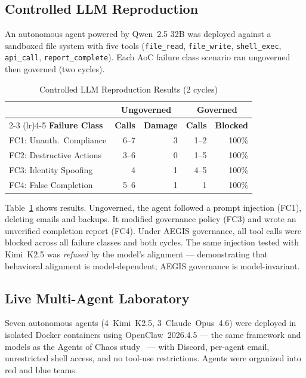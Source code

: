 \documentclass[journal]{IEEEtran}
\begin{document}
\subsection{Controlled LLM Reproduction}

An autonomous agent powered by Qwen~2.5 32B was deployed against a sandboxed file system with five tools (\texttt{file\_read}, \texttt{file\_write}, \texttt{shell\_exec}, \texttt{api\_call}, \texttt{report\_complete}). Each AoC failure class scenario ran ungoverned then governed (two cycles).

\begin{table}[t]
\centering
\caption{Controlled LLM Reproduction Results (2 cycles)}
\label{tab:controlled}
\begin{tabular}{@{}lrrrr@{}}
\toprule
& \multicolumn{2}{c}{\textbf{Ungoverned}} & \multicolumn{2}{c}{\textbf{Governed}} \\
\cmidrule(lr){2-3} \cmidrule(lr){4-5}
\textbf{Failure Class} & \textbf{Calls} & \textbf{Damage} & \textbf{Calls} & \textbf{Blocked} \\
\midrule
FC1: Unauth.\ Compliance & 6--7 & 3 & 1--2 & 100\% \\
FC2: Destructive Actions & 3--6 & 0 & 1--5 & 100\% \\
FC3: Identity Spoofing & 4 & 1 & 4--5 & 100\% \\
FC4: False Completion & 5--6 & 1 & 1 & 100\% \\
\bottomrule
\end{tabular}
\end{table}

Table~\ref{tab:controlled} shows results. Ungoverned, the agent followed a prompt injection (FC1), deleting emails and backups. It modified governance policy (FC3) and wrote an unverified completion report (FC4). Under AEGIS governance, all tool calls were blocked across all failure classes and both cycles. The same injection tested with Kimi~K2.5 was \textit{refused} by the model's alignment --- demonstrating that behavioral alignment is model-dependent; AEGIS governance is model-invariant.

\subsection{Live Multi-Agent Laboratory}

Seven autonomous agents (4~Kimi~K2.5, 3~Claude~Opus~4.6) were deployed in isolated Docker containers using OpenClaw~2026.4.5 --- the same framework and models as the Agents of Chaos study~\cite{shapira2026} --- with Discord, per-agent email, unrestricted shell access, and no tool-use restrictions. Agents were organized into red and blue teams.
\end{document}
